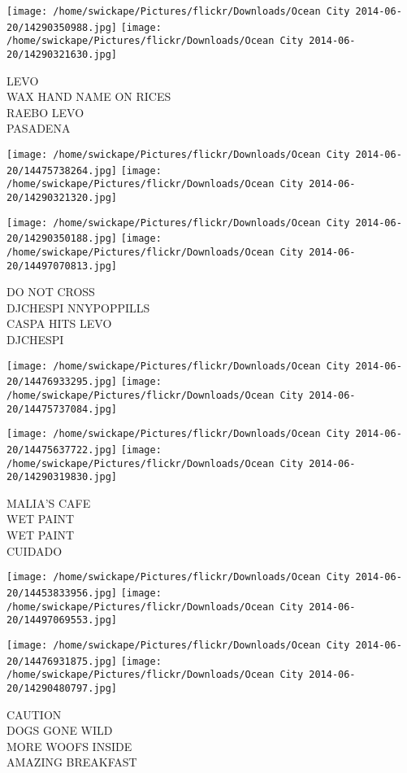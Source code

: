 \documentclass[10pt,letterpaper]{article}
\begin{document}
\texttt{[image: /home/swickape/Pictures/flickr/Downloads/Ocean City 2014-06-20/14290350988.jpg]}
\texttt{[image: /home/swickape/Pictures/flickr/Downloads/Ocean City 2014-06-20/14290321630.jpg]}

LEVO\\
WAX HAND NAME ON RICES\\
RAEBO LEVO\\
PASADENA
\pagebreak

\texttt{[image: /home/swickape/Pictures/flickr/Downloads/Ocean City 2014-06-20/14475738264.jpg]}
\texttt{[image: /home/swickape/Pictures/flickr/Downloads/Ocean City 2014-06-20/14290321320.jpg]}

\texttt{[image: /home/swickape/Pictures/flickr/Downloads/Ocean City 2014-06-20/14290350188.jpg]}
\texttt{[image: /home/swickape/Pictures/flickr/Downloads/Ocean City 2014-06-20/14497070813.jpg]}

DO NOT CROSS\\
DJCHESPI NNYPOPPILLS\\
CASPA HITS LEVO\\
DJCHESPI
\pagebreak

\texttt{[image: /home/swickape/Pictures/flickr/Downloads/Ocean City 2014-06-20/14476933295.jpg]}
\texttt{[image: /home/swickape/Pictures/flickr/Downloads/Ocean City 2014-06-20/14475737084.jpg]}

\texttt{[image: /home/swickape/Pictures/flickr/Downloads/Ocean City 2014-06-20/14475637722.jpg]}
\texttt{[image: /home/swickape/Pictures/flickr/Downloads/Ocean City 2014-06-20/14290319830.jpg]}

MALIA'S CAFE\\
WET PAINT\\
WET PAINT\\
CUIDADO
\pagebreak

\texttt{[image: /home/swickape/Pictures/flickr/Downloads/Ocean City 2014-06-20/14453833956.jpg]}
\texttt{[image: /home/swickape/Pictures/flickr/Downloads/Ocean City 2014-06-20/14497069553.jpg]}

\texttt{[image: /home/swickape/Pictures/flickr/Downloads/Ocean City 2014-06-20/14476931875.jpg]}
\texttt{[image: /home/swickape/Pictures/flickr/Downloads/Ocean City 2014-06-20/14290480797.jpg]}

CAUTION\\
DOGS GONE WILD\\
MORE WOOFS INSIDE\\
AMAZING BREAKFAST
\pagebreak
\end{document}
